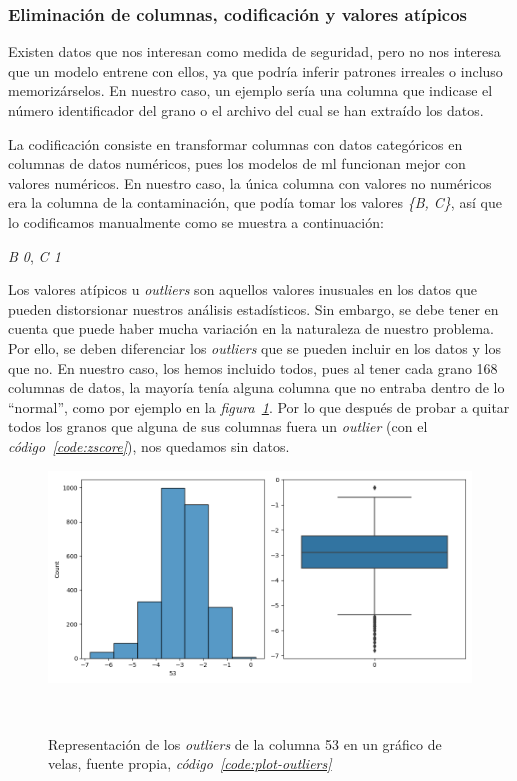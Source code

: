 \subsubsection{Eliminación de columnas, codificación y valores atípicos}

Existen datos que nos interesan como medida de seguridad, pero no nos interesa que un modelo entrene con ellos, ya que podría inferir patrones irreales o incluso memorizárselos. En nuestro caso, un ejemplo sería una columna que indicase el número identificador del grano o el archivo del cual se han extraído los datos.

La codificación consiste en transformar columnas con datos categóricos en columnas de datos numéricos, pues los modelos de \acrshort{ml} funcionan mejor con valores numéricos. En nuestro caso, la única columna con valores no numéricos era la columna de la contaminación, que podía tomar los valores \textit{\{B, C\}}, así que lo codificamos manualmente como se muestra a continuación:

{
    \centering
    \textit{B \longrightarrow{} 0}, \textit{C \longrightarrow{} 1}\par
}

Los valores atípicos u \textit{outliers} son aquellos valores inusuales en los datos que pueden distorsionar nuestros análisis estadísticos. Sin embargo, se debe tener en cuenta que puede haber mucha variación en la naturaleza de nuestro problema. Por ello, se deben diferenciar los \textit{outliers} que se pueden incluir en los datos y los que no. En nuestro caso, los hemos incluido todos, pues al tener cada grano 168 columnas de datos, la mayoría tenía alguna columna que no entraba dentro de lo ``normal'', como por ejemplo en la \textit{figura\ \ref{fig:outliers}}. Por lo que después de probar a quitar todos los granos que alguna de sus columnas fuera un \textit{outlier} (con el \textit{código\ \ref{code:zscore}}), nos quedamos sin datos.

\begin{figure}[!h]
    \centering
    \includegraphics[width=0.7\linewidth]{media/images/col-53-outliers.png}
    \caption{Representación de los \textit{outliers} de la columna 53 en un gráfico de velas, fuente propia, \textit{código\ \ref{code:plot-outliers}}}\ \label{fig:outliers}
\end{figure}



